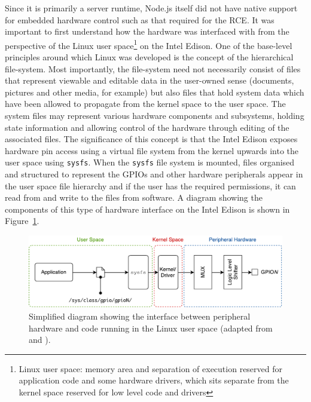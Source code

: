       Since it is primarily a server runtime, Node.js itself did not have native support for embedded hardware control such as that required for the RCE. It was important to first understand how the hardware was interfaced with from the perspective of the Linux user space\footnote{Linux user space: memory area and separation of execution reserved for application code and some hardware drivers, which sits separate from the kernel space reserved for low level code and drivers} on the Intel Edison. One of the base-level principles around which Linux was developed is the concept of the hierarchical file-system. Most importantly, the file-system need not necessarily consist of files that represent viewable and editable data in the user-owned sense (documents, pictures and other media, for example) but also files that hold system data which have been allowed to propagate from the kernel space to the user space. The system files may represent various hardware components and subsystems, holding state information and allowing control of the hardware through editing of the associated files. The significance of this concept is that the Intel Edison exposes hardware pin access using a virtual file system from the kernel upwards into the user space using \texttt{sysfs}. When the \texttt{sysfs} file system is mounted, files organised and structured to represent the GPIOs and other hardware peripherals appear in the user space file hierarchy and if the user has the required permissions, it can read from and write to the files from software. A diagram showing the components of this type of hardware interface on the Intel Edison is shown in Figure~\ref{fig:softDesign-sysfsExample}.
      
      \begin{figure}[h!]
        \centering
        \includegraphics[width=0.8\linewidth]{figures/softDesign-sysfsExample}
        \caption[Simplified diagram showing the interface between peripheral hardware and code running in the Linux user space.]{Simplified diagram showing the interface between peripheral hardware and code running in the Linux user space (adapted from \cite{fig:softDesign-sysfsExample_cite1} and \cite{fig:softDesign-sysfsExample_cite2}).}
        \label{fig:softDesign-sysfsExample}
      \end{figure}
      
